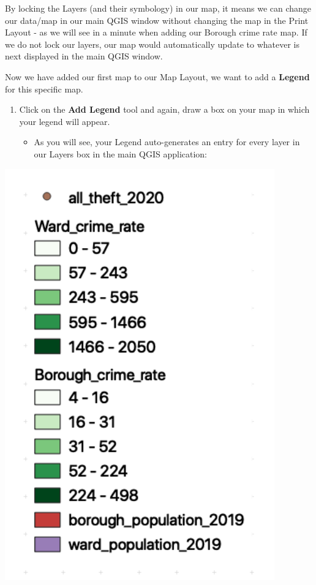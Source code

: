 \documentclass[
]{book}
\providecommand{\tightlist}{%
  \setlength{\itemsep}{0pt}\setlength{\parskip}{0pt}}
\begin{document}
By locking the Layers (and their symbology) in our map, it means we can change our data/map in our main QGIS window without changing the map in the Print Layout - as we will see in a minute when adding our Borough crime rate map. If we do not lock our layers, our map would automatically update to whatever is next displayed in the main QGIS window.

Now we have added our first map to our Map Layout, we want to add a \textbf{Legend} for this specific map.

\begin{enumerate}
\def\labelenumi{\arabic{enumi}.}
\setcounter{enumi}{2}
\tightlist
\item
  Click on the \textbf{Add Legend} tool and again, draw a box on your map in which your legend will appear.

  \begin{itemize}
  \tightlist
  \item
    As you will see, your Legend auto-generates an entry for every layer in our Layers box in the main QGIS application:
  \end{itemize}
\end{enumerate}

\begin{center}\includegraphics[width=4.58in]{images/w03/autolegend} \end{center}
\end{document}
